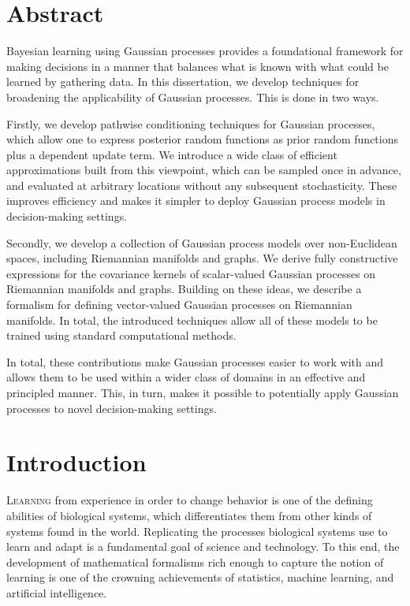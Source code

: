 \documentclass[11pt]{book}
\begin{document}
\chapter*{Abstract}

Bayesian learning using Gaussian processes provides a foundational framework for making decisions in a manner that balances what is known with what could be learned by gathering data. 
In this dissertation, we develop techniques for broadening the applicability of Gaussian processes.
This is done in two ways.

Firstly, we develop pathwise conditioning techniques for Gaussian processes, which allow one to express posterior random functions as prior random functions plus a dependent update term.
We introduce a wide class of efficient approximations built from this viewpoint, which can be sampled once in advance, and evaluated at arbitrary locations without any subsequent stochasticity.
These improves efficiency and makes it simpler to deploy Gaussian process models in decision-making settings.

Secondly, we develop a collection of Gaussian process models over non-Euclidean spaces, including Riemannian manifolds and graphs.
We derive fully constructive expressions for the covariance kernels of scalar-valued Gaussian processes on Riemannian manifolds and graphs.
Building on these ideas, we describe a formalism for defining vector-valued Gaussian processes on Riemannian manifolds. 
In total, the introduced techniques allow all of these models to be trained using standard computational methods.

In total, these contributions make Gaussian processes easier to work with and allows them to be used within a wider class of domains in an effective and principled manner.
This, in turn, makes it possible to potentially apply Gaussian processes to novel decision-making settings.

\tableofcontents





\chapter{Introduction}
\label{ch:intro}

\lettrine{L}{earning} from experience in order to change behavior is one of the defining abilities of biological systems, which differentiates them from other kinds of systems found in the world.
Replicating the processes biological systems use to learn and adapt is a fundamental goal of science and technology.
To this end, the development of mathematical formalisms rich enough to capture the notion of learning is one of the crowning achievements of statistics, machine learning, and artificial intelligence.
\end{document}
